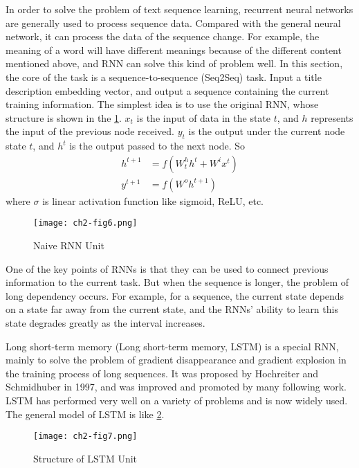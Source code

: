 In order to solve the problem of text sequence learning, recurrent neural networks are generally used to process sequence data. Compared with the general neural network, it can process the data of the sequence change. For example, the meaning of a word will have different meanings because of the different content mentioned above, and RNN can solve this kind of problem well. In this section, the core of the task is a sequence-to-sequence (Seq2Seq) task. Input a title description embedding vector, and output a sequence containing the current training information. The simplest idea is to use the original RNN, whose structure is shown in the \figurename{\ref{ch2-fig6}}. \(x_t\) is the input of data in the state \(t\), and \(h\) represents the input of the previous node received. \(y_t\) is the output under the current node state \(t\), and \(h^{t}\) is the output passed to the next node. So
\begin{align}
	h^{t+1} & =f(W^h_{t} h^t+W^i x^t) \\
	y^{t+1} & =f(W^o h^{t+1})
\end{align}
where \(\sigma \) is linear activation function like sigmoid, ReLU, etc.

\begin{figure}[htbp!]
	\centering
	\texttt{[image: ch2-fig6.png]}
	\caption{Naive RNN Unit}\label{ch2-fig6}
\end{figure}

One of the key points of RNNs is that they can be used to connect previous information to the current task. But when the sequence is longer, the problem of long dependency occurs. For example, for a sequence, the current state depends on a state far away from the current state, and the RNNs' ability to learn this state degrades greatly as the interval increases.

Long short-term memory (Long short-term memory, LSTM) is a special RNN, mainly to solve the problem of gradient disappearance and gradient explosion in the training process of long sequences. It was proposed by Hochreiter and Schmidhuber in 1997\cite{lstm1997}, and was improved and promoted by many following work. LSTM has performed very well on a variety of problems and is now widely used. The general model of LSTM is like \figurename{\ref{ch2-fig7}}.

\begin{figure}[htbp!]
	\centering
	\texttt{[image: ch2-fig7.png]}
	\caption{Structure of LSTM Unit}\label{ch2-fig7}
\end{figure}

